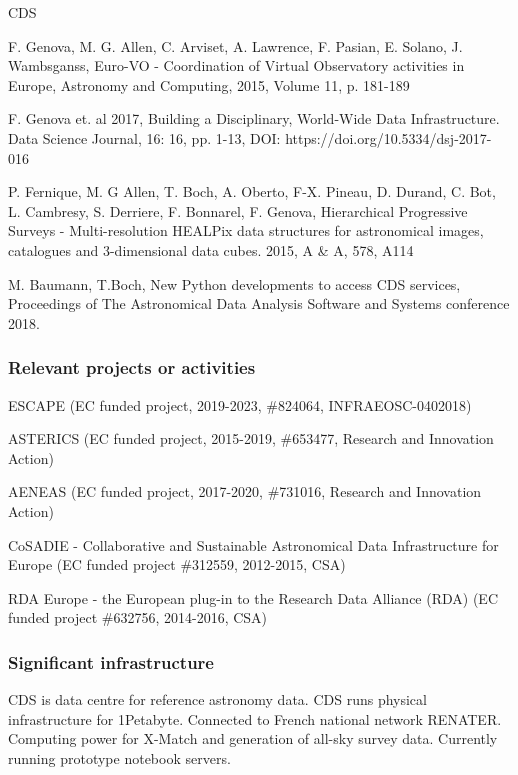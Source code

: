 \begin{sitedescription}{CDS}
\begin{compactenum}
  \item F. Genova, M. G. Allen, C. Arviset, A. Lawrence, F. Pasian, E. Solano, J. Wambsganss, Euro-VO - Coordination of Virtual Observatory activities in Europe, Astronomy and Computing, 2015, Volume 11, p. 181-189
  \item F. Genova et. al 2017, Building a Disciplinary, World-Wide Data Infrastructure. Data Science Journal, 16: 16, pp. 1-13, DOI: https://doi.org/10.5334/dsj-2017-016
  \item P. Fernique, M. G Allen, T. Boch, A. Oberto, F-X. Pineau, D. Durand, C. Bot, L. Cambresy, S. Derriere, F. Bonnarel, F. Genova, Hierarchical Progressive Surveys - Multi-resolution HEALPix data structures for astronomical images, catalogues and 3-dimensional data cubes.  2015, A \& A, 578, A114 
  \item M. Baumann, T.Boch, New Python developments to access CDS services, Proceedings of The Astronomical Data Analysis Software and Systems conference 2018.
\end{compactenum}

\subsubsection*{Relevant projects or activities}

\begin{compactenum}
  \item ESCAPE (EC funded project, 2019-2023, \#824064, INFRAEOSC-0402018)
  \item ASTERICS (EC funded project, 2015-2019, \#653477, Research and Innovation Action)
  \item AENEAS (EC funded project,  2017-2020, \#731016, Research and Innovation Action)
  \item CoSADIE - Collaborative and Sustainable Astronomical Data Infrastructure for Europe (EC funded project \#312559, 2012-2015, CSA)
  \item RDA Europe - the European plug-in to the Research Data Alliance (RDA) (EC funded project \#632756, 2014-2016, CSA)
\end{compactenum}

\subsubsection*{Significant infrastructure}

CDS is data centre for reference astronomy data. CDS runs physical infrastructure for 1Petabyte. Connected to French national network RENATER. Computing power for X-Match and generation of all-sky survey data. Currently running prototype notebook servers.


\end{sitedescription}
